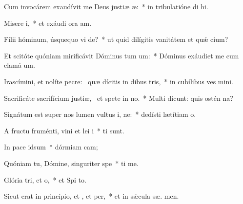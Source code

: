 \item Cum invocárem exaudívit me Deus justiæ æ:~* in tribulatióne di hi.
\item Misere i,~* et exáudi ora am.
\item Fílii hóminum, úsquequo vi de?~* ut quid dilígitis vanitátem et quǽ cium?
\item Et scitóte quóniam mirificávit Dóminus tum um:~* Dóminus exáudiet me cum clamá  um.
\item Irascímini, et nolíte pecre:~\pscross{} quæ dícitis in dibus tris,~* in cubílibus ves mini.
\item Sacrificáte sacrifícium justiæ,~\pscross{} et spete in no.~* Multi dicunt: quis ostén  na?
\item Signátum est super nos lumen vultus i, ne:~* dedísti lætítiam   o.
\item A fructu fruménti, vini et lei i~* ti sunt.
\item In pace  idsum~* dórmiam  cam;
\item Quóniam tu, Dómine, singuriter  spe~* ti me.
\item Glória tri, et o,~* et Spi to.
\item Sicut erat in princípio, et , et per,~* et in sǽcula sæ. men.
